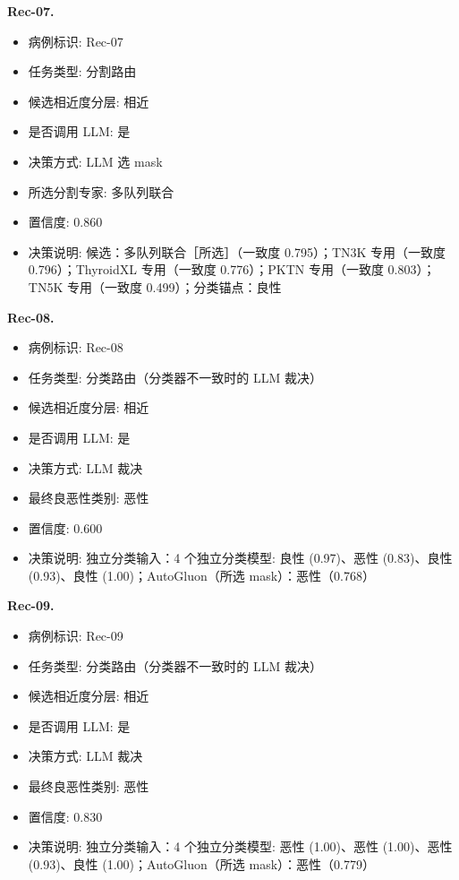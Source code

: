 \noindent\textbf{\textbf{Rec-07}.}\par
\begin{itemize}[leftmargin=1.5em,topsep=0.1em,itemsep=0.05em]
\item 病例标识: Rec-07
\item 任务类型: 分割路由
\item 候选相近度分层: 相近
\item 是否调用 LLM: 是
\item 决策方式: LLM 选 mask
\item 所选分割专家: 多队列联合
\item 置信度: 0.860
\item 决策说明: 候选：多队列联合［所选］（一致度 0.795）；TN3K 专用（一致度 0.796）；ThyroidXL 专用（一致度 0.776）；PKTN 专用（一致度 0.803）；TN5K 专用（一致度 0.499）；分类锚点：良性
\end{itemize}
\noindent\textbf{Rec-08.}\par
\begin{itemize}[leftmargin=1.5em,topsep=0.1em,itemsep=0.05em]
\item 病例标识: Rec-08
\item 任务类型: 分类路由（分类器不一致时的 LLM 裁决）
\item 候选相近度分层: 相近
\item 是否调用 LLM: 是
\item 决策方式: LLM 裁决
\item 最终良恶性类别: 恶性
\item 置信度: 0.600
\item 决策说明: 独立分类输入：4 个独立分类模型: 良性 (0.97)、恶性 (0.83)、良性 (0.93)、良性 (1.00)；AutoGluon（所选 mask）：恶性（0.768）
\end{itemize}
\noindent\textbf{Rec-09.}\par
\begin{itemize}[leftmargin=1.5em,topsep=0.1em,itemsep=0.05em]
\item 病例标识: Rec-09
\item 任务类型: 分类路由（分类器不一致时的 LLM 裁决）
\item 候选相近度分层: 相近
\item 是否调用 LLM: 是
\item 决策方式: LLM 裁决
\item 最终良恶性类别: 恶性
\item 置信度: 0.830
\item 决策说明: 独立分类输入：4 个独立分类模型: 恶性 (1.00)、恶性 (1.00)、恶性 (0.93)、良性 (1.00)；AutoGluon（所选 mask）：恶性（0.779）
\end{itemize}
